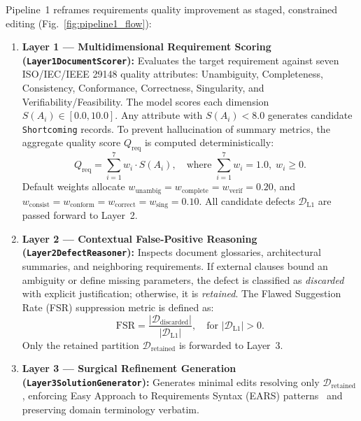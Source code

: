 \documentclass[journal]{IEEEtran}
\begin{document}
Pipeline~1 reframes requirements quality improvement as staged, constrained editing (Fig.~\ref{fig:pipeline1_flow}):
\begin{enumerate}
    \item \textbf{Layer 1 --- Multidimensional Requirement Scoring (\texttt{Layer1DocumentScorer}):} Evaluates the target requirement against seven ISO/IEC/IEEE 29148 quality attributes: Unambiguity, Completeness, Consistency, Conformance, Correctness, Singularity, and Verifiability/Feasibility. The model scores each dimension $S(A_i) \in [0.0, 10.0]$. Any attribute with $S(A_i) < 8.0$ generates candidate \texttt{Shortcoming} records. To prevent hallucination of summary metrics, the aggregate quality score $Q_{\text{req}}$ is computed deterministically:
    \begin{equation}
    Q_{\text{req}} = \sum_{i=1}^{7} w_i \cdot S(A_i), \quad \text{where } \sum_{i=1}^{7} w_i = 1.0, \; w_i \ge 0.
    \label{eq:qreq}
    \end{equation}
    Default weights allocate $w_{\text{unambig}} = w_{\text{complete}} = w_{\text{verif}} = 0.20$, and $w_{\text{consist}} = w_{\text{conform}} = w_{\text{correct}} = w_{\text{sing}} = 0.10$. All candidate defects $\mathcal{D}_{\text{L1}}$ are passed forward to Layer~2.

    \item \textbf{Layer 2 --- Contextual False-Positive Reasoning (\texttt{Layer2DefectReasoner}):} Inspects document glossaries, architectural summaries, and neighboring requirements. If external clauses bound an ambiguity or define missing parameters, the defect is classified as \emph{discarded} with explicit justification; otherwise, it is \emph{retained}. The Flawed Suggestion Rate (FSR) suppression metric is defined as:
    \begin{equation}
    \text{FSR} = \frac{|\mathcal{D}_{\text{discarded}}|}{|\mathcal{D}_{\text{L1}}|}, \quad \text{for } |\mathcal{D}_{\text{L1}}| > 0.
    \label{eq:fsr}
    \end{equation}
    Only the retained partition $\mathcal{D}_{\text{retained}}$ is forwarded to Layer~3.

    \item \textbf{Layer 3 --- Surgical Refinement Generation (\texttt{Layer3SolutionGenerator}):} Generates minimal edits resolving only $\mathcal{D}_{\text{retained}}$, enforcing Easy Approach to Requirements Syntax (EARS) patterns~\cite{mavin2009ears} and preserving domain terminology verbatim.


\end{enumerate}
\end{document}
